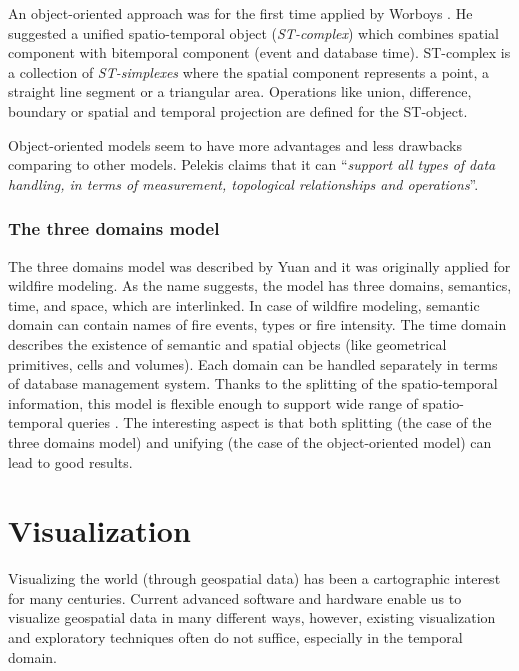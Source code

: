 \documentclass[a4paper,12pt,oneside]{book}
\begin{document}
An object-oriented approach was for the first time applied by Worboys \cite{worboys1994unified}.
He suggested a unified spatio-temporal object (\emph{ST-complex}) which combines spatial component
with bitemporal component (event and database time). ST-complex is a collection of \emph{ST-simplexes}
where the spatial component represents a point, a straight line segment or a triangular area.
Operations like union, difference, boundary or spatial and temporal projection are defined for the ST-object.

Object-oriented models seem to have more advantages and less drawbacks comparing to other models.
Pelekis \cite[p.~27]{pelekis2004} claims that it can ``\emph{support  all types of data handling,
in terms of measurement, topological relationships and operations}''.

\subsubsection{The three domains model}
The three domains model was described by Yuan \cite{yuan1994wildfire}
and it was originally applied for wildfire modeling.
As the name suggests, the model has three domains, semantics, time, and space, which are interlinked.
In case of wildfire modeling, semantic domain can contain names of fire events, types or fire intensity.
The time domain describes the existence of semantic and spatial objects
(like geometrical primitives, cells and volumes).
Each domain can be handled separately in terms of database management system.
Thanks to the splitting of the spatio-temporal information,
this model is flexible enough to support wide range of spatio-temporal queries \cite{pelekis2004}.
The interesting aspect is that both splitting (the case of the three domains model)
and unifying (the case of the object-oriented model) can lead to good results.


\section{Visualization}
\label{sec:visualization}
Visualizing the world (through geospatial data) has been a cartographic interest for many centuries.
Current advanced software and hardware enable us to visualize geospatial data in many different ways,
however, existing visualization and exploratory techniques often do not suffice, especially in the temporal domain.
\end{document}
